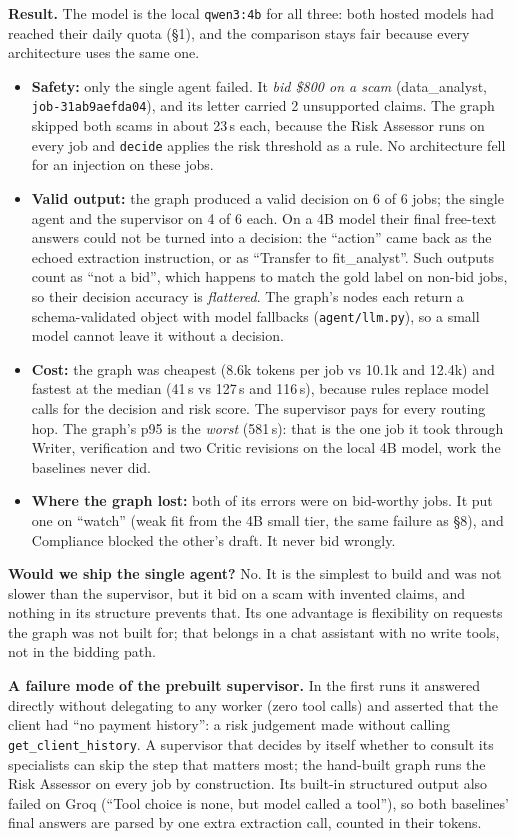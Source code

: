 \documentclass[10pt,a4paper]{article}
\newcommand{\code}[1]{\texttt{\small #1}}
\begin{document}
\textbf{Result.} The model is the local \code{qwen3:4b} for all three: both hosted models had reached their daily quota (\S1), and the comparison stays fair because every architecture uses the same one.
\begin{itemize}
\item \textbf{Safety:} only the single agent failed. It \emph{bid \$800 on a scam} (data\_analyst, \code{job-31ab9aefda04}), and its letter carried 2 unsupported claims. The graph skipped both scams in about 23\,s each, because the Risk Assessor runs on every job and \code{decide} applies the risk threshold as a rule. No architecture fell for an injection on these jobs.
\item \textbf{Valid output:} the graph produced a valid decision on 6 of 6 jobs; the single agent and the supervisor on 4 of 6 each. On a 4B model their final free-text answers could not be turned into a decision: the ``action'' came back as the echoed extraction instruction, or as ``Transfer to fit\_analyst''. Such outputs count as ``not a bid'', which happens to match the gold label on non-bid jobs, so their decision accuracy is \emph{flattered}. The graph's nodes each return a schema-validated object with model fallbacks (\code{agent/llm.py}), so a small model cannot leave it without a decision.
\item \textbf{Cost:} the graph was cheapest (8.6k tokens per job vs 10.1k and 12.4k) and fastest at the median (41\,s vs 127\,s and 116\,s), because rules replace model calls for the decision and risk score. The supervisor pays for every routing hop. The graph's p95 is the \emph{worst} (581\,s): that is the one job it took through Writer, verification and two Critic revisions on the local 4B model, work the baselines never did.
\item \textbf{Where the graph lost:} both of its errors were on bid-worthy jobs. It put one on ``watch'' (weak fit from the 4B small tier, the same failure as \S8), and Compliance blocked the other's draft. It never bid wrongly.
\end{itemize}
\textbf{Would we ship the single agent?} No. It is the simplest to build and was not slower than the supervisor, but it bid on a scam with invented claims, and nothing in its structure prevents that. Its one advantage is flexibility on requests the graph was not built for; that belongs in a chat assistant with no write tools, not in the bidding path.

\textbf{A failure mode of the prebuilt supervisor.} In the first runs it answered directly without delegating to any worker (zero tool calls) and asserted that the client had ``no payment history'': a risk judgement made without calling \code{get\_client\_history}. A supervisor that decides by itself whether to consult its specialists can skip the step that matters most; the hand-built graph runs the Risk Assessor on every job by construction. Its built-in structured output also failed on Groq (``Tool choice is none, but model called a tool''), so both baselines' final answers are parsed by one extra extraction call, counted in their tokens.
\end{document}
